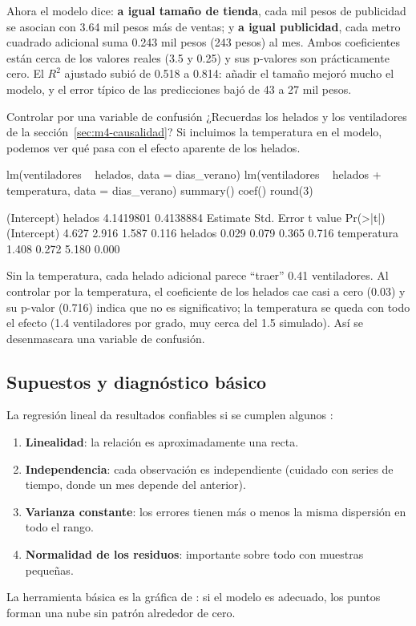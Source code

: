 Ahora el modelo dice: \textbf{a igual tamaño de tienda}, cada mil pesos de
publicidad se asocian con 3.64 mil pesos más de ventas; y \textbf{a igual
publicidad}, cada metro cuadrado adicional suma 0.243 mil pesos (243 pesos)
al mes. Ambos coeficientes están cerca de los valores reales (3.5 y 0.25) y
sus p-valores son prácticamente cero. El $R^2$ ajustado subió de 0.518 a
0.814: añadir el tamaño mejoró mucho el modelo, y el error típico de las
predicciones bajó de 43 a 27 mil pesos.

\begin{ejemplo}{Controlar por una variable de confusión}
¿Recuerdas los helados y los ventiladores de la
sección~\ref{sec:m4-causalidad}? Si incluimos la temperatura en el modelo,
podemos ver qué pasa con el efecto aparente de los helados.
\end{ejemplo}

\begin{rcode}
lm(ventiladores ~ helados, data = dias_verano) %
lm(ventiladores ~ helados + temperatura, data = dias_verano) %
  summary() %
  coef() %
  round(3)
\end{rcode}
\begin{rsalida}
(Intercept)     helados
  4.1419801   0.4138884
            Estimate Std. Error t value Pr(>|t|)
(Intercept)    4.627      2.916   1.587    0.116
helados        0.029      0.079   0.365    0.716
temperatura    1.408      0.272   5.180    0.000
\end{rsalida}

Sin la temperatura, cada helado adicional parece ``traer'' 0.41
ventiladores. Al controlar por la temperatura, el coeficiente de los
helados cae casi a cero (0.03) y su p-valor (0.716) indica que no es
significativo; la temperatura se queda con todo el efecto (1.4 ventiladores
por grado, muy cerca del 1.5 simulado). Así se desenmascara una variable de
confusión.

\subsection{Supuestos y diagnóstico básico}

La regresión lineal da resultados confiables si se cumplen algunos
:
\begin{enumerate}
  \item \textbf{Linealidad}: la relación es aproximadamente una recta.
  \item \textbf{Independencia}: cada observación es independiente (cuidado
        con series de tiempo, donde un mes depende del anterior).
  \item \textbf{Varianza constante}: los errores tienen más o menos la misma
        dispersión en todo el rango.
  \item \textbf{Normalidad de los residuos}: importante sobre todo con
        muestras pequeñas.
\end{enumerate}
La herramienta básica es la gráfica de : si el modelo es adecuado, los puntos forman una nube sin patrón
alrededor de cero.


